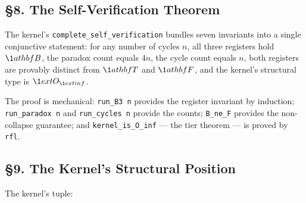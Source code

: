 \documentclass[10pt,a4paper]{article}
\newcommand{\pilcrow}{\S}
\begin{document}
\subsection{\pilcrow{}8. The Self-Verification Theorem}

The kernel's \texttt{complete\_\allowbreak self\_\allowbreak verification} bundles seven invariants into a single conjunctive statement: for any number of cycles $n$, all three registers hold $\\\1athbf{B}$, the paradox count equals $4n$, the cycle count equals $n$, both registers are provably distinct from $\\\1athbf{T}$ and $\\\1athbf{F}$, and the kernel's structural type is $\\\1ext{O}_{\\\1ext{inf}}$.

The proof is mechanical: \texttt{run\_\allowbreak B3 n} provides the register invariant by induction; \texttt{run\_\allowbreak paradox n} and \texttt{run\_\allowbreak cycles n} provide the counts; \texttt{B\_\allowbreak ne\_\allowbreak F} provides the non-collapse guarantee; and \texttt{kernel\_\allowbreak is\_\allowbreak O\_\allowbreak inf} --- the tier theorem --- is proved by \texttt{rfl}.

\subsection{\pilcrow{}9. The Kernel's Structural Position}

The kernel's tuple:
\end{document}
